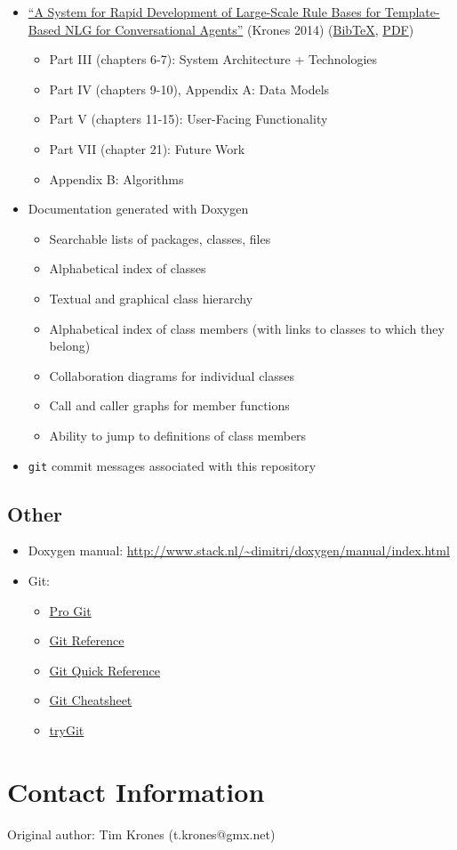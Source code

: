 \documentclass[11pt]{article}
\begin{document}
\begin{itemize}
\item \href{http://www.dfki.de/lt/publication_show.php?id=7689}{``A System for Rapid Development of Large-Scale Rule Bases for Template-Based NLG for Conversational Agents''} (Krones 2014) (\href{http://www.dfki.de/lt/bibtex.php?id=7689}{BibTeX}, \href{http://www.dfki.de/web/forschung/iwi/publikationen/renameFileForDownload?filename=thesis-krones-final.pdf&file_id=uploads_2404}{PDF})
\begin{itemize}
\item Part III (chapters 6-7): System Architecture + Technologies
\item Part IV (chapters 9-10), Appendix A: Data Models
\item Part V (chapters 11-15): User-Facing Functionality
\item Part VII (chapter 21): Future Work
\item Appendix B: Algorithms
\end{itemize}
\item Documentation generated with Doxygen
\begin{itemize}
\item Searchable lists of packages, classes, files
\item Alphabetical index of classes
\item Textual and graphical class hierarchy
\item Alphabetical index of class members (with links to classes to
which they belong)
\item Collaboration diagrams for individual classes
\item Call and caller graphs for member functions
\item Ability to jump to definitions of class members
\end{itemize}
\item \texttt{git} commit messages associated with this repository
\end{itemize}

\subsection{Other}
\label{sec-4-5}
\begin{itemize}
\item Doxygen manual:
\url{http://www.stack.nl/~dimitri/doxygen/manual/index.html}
\item Git:
\begin{itemize}
\item \href{http://git-scm.com/book}{Pro Git}
\item \href{http://gitref.org/}{Git Reference}
\item \href{http://jonas.nitro.dk/git/quick-reference.html}{Git Quick Reference}
\item \href{http://www.ndpsoftware.com/git-cheatsheet.html}{Git Cheatsheet}
\item \href{https://www.codeschool.com/courses/try-git}{tryGit}
\end{itemize}
\end{itemize}

\section{Contact Information}
\label{sec-5}
Original author: Tim Krones (t.krones@gmx.net)
\end{document}
